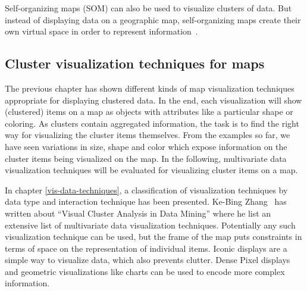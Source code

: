 Self-organizing maps (SOM) can also be used to visualize clusters of data. But instead of displaying data on a geographic map, self-organizing maps create their own virtual space in order to represent information~\cite{noellenburg11geovis}.  


\subsection{Cluster visualization techniques for maps}
\label{chapter:cluster-vis}

The previous chapter has shown different kinds of map visualization techniques appropriate for displaying clustered data. In the end, each visualization will show (clustered) items on a map as objects with attributes like a particular shape or coloring. As clusters contain aggregated information, the task is to find the right way for visualizing the cluster items themselves. From the examples so far, we have seen variations in size, shape and color which expose information on the cluster items being visualized on the map. In the following, multivariate data visualization techniques will be evaluated for visualizing cluster items on a map.

In chapter \ref{vis-data-techniques}, a classification of visualization techniques by data type and interaction technique has been presented. Ke-Bing Zhang~\cite{zhang07thesis} has written about ``Visual Cluster Analysis in Data Mining'' where he list an extensive list of multivariate data visualization techniques. Potentially any such visualization technique can be used, but the frame of the map puts constraints in terms of space on the representation of individual items. Iconic displays are a simple way to visualize data, which also prevents clutter. Dense Pixel displays and geometric visualizations like charts can be used to encode more complex information.

